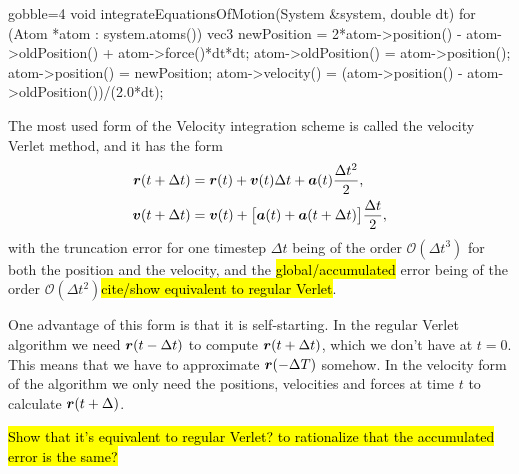 \begin{listing}[h]
\begin{cppcode*}{gobble=4}
    void integrateEquationsOfMotion(System &system, double dt)
    {
        for (Atom *atom : system.atoms())
        {
            vec3 newPosition = 2*atom->position() - atom->oldPosition() 
                               + atom->force()*dt*dt;
            atom->oldPosition() = atom->position();
            atom->position() = newPosition;
            atom->velocity() = (atom->position() - atom->oldPosition())/(2.0*dt);
        }
    }
\end{cppcode*}
\caption{
    Caption.
    \label{list:regular_verlet}
}
\end{listing}

The most used form of the Velocity integration scheme is called the velocity Verlet method\cite{swope1982computer}, and it has the form
\begin{align}
    \boldsymbol{r}(t + \Delta t) &= \boldsymbol{r}(t) + \boldsymbol{v}(t)\Delta t + \boldsymbol{a}(t)\frac{\Delta t^2}{2}, \label{eq:velocity_verlet_position}\\
    \boldsymbol{v}(t + \Delta t) &= \boldsymbol{v}(t) + \big[\boldsymbol{a}(t) + \boldsymbol{a}(t + \Delta t)\big] \frac{\Delta t}{2}, \label{eq:velocity_verlet_velocity}
\end{align}
with the truncation error for one timestep $\Delta t$ being of the order $\mathcal{O}(\Delta t^3)$ for both the position and the velocity, and the \hl{global/accumulated} error being of the order $\mathcal{O}(\Delta t^2)$\hl{cite/show equivalent to regular Verlet}. 

One advantage of this form is that it is self-starting. In the regular Verlet algorithm we need $\boldsymbol{r}(t-\Delta t)$ to compute $\boldsymbol{r}(t+\Delta t)$, which we don't have at $t = 0$. This means that we have to approximate $\boldsymbol{r}(-\Delta T)$ somehow. In the velocity form of the algorithm we only need the positions, velocities and forces at time $t$ to calculate $\boldsymbol{r}(t+\Delta)$.

\hl{Show that it's equivalent to regular Verlet? to rationalize that the accumulated error is the same?}

